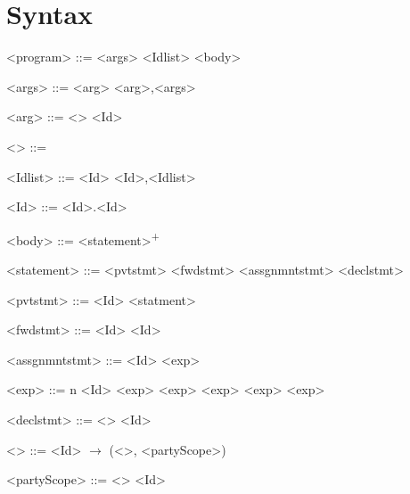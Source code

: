 
\section{Syntax}

\begin{grammar}

    <program> ::= <args> <Idlist> \lit{\{} <body> \lit{\}}

    <args> ::= <arg>
    \alt <arg>,<args>

    <arg> ::= <\texttau> <Id>

    <\texttau> ::=  \alt {}

    <Idlist> ::= <Id>
    \alt <Id>,<Idlist>

    <Id> ::= \lit{[a-z, A-Z]\textsuperscript{+}} \alt <Id>.<Id> \alt

    <body> ::= <statement>\textsuperscript{+}

    <statement> ::= <pvtstmt> \alt <fwdstmt> \alt <assgnmntstmt> \alt <declstmt>

    <pvtstmt> ::=  <Id> \lit{\{} <statment> \lit{\}}

    <fwdstmt> ::= <Id> \lit{$\Rightarrow$} <Id>

    <assgnmntstmt> ::= <Id> \lit{=} <exp>

    <exp> ::= n \alt <Id> \alt <exp> \lit{+} <exp> \alt \lit{(}<exp>\lit{)} \alt <exp> \lit{*} <exp>

    <declstmt> ::= <\texttau> <Id>

    <\textGamma> ::= <Id> $\rightarrow$ (<\texttau>, <partyScope>)

    <partyScope> ::= <\textzeta> \alt <Id>

\end{grammar}
